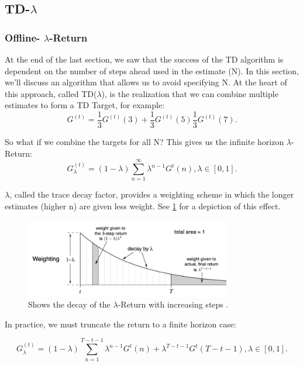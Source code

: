 \documentclass[11pt]{article}
\begin{document}
\subsection{TD-$\lambda$}
\subsubsection{Offline- $\lambda$-Return}
At the end of the last section, we saw that the success of the TD algorithm is dependent on the number of steps ahead used in the estimate (N). In this section, we'll discuss an algorithm that allows us to avoid specifying N. At the heart of this approach, called TD($\lambda$), is the realization that we can combine multiple estimates to form a TD Target, for example:
\begin{equation}
    G^{(t)} = \frac{1}{3}G^{(t)}(3)+\frac{1}{3}G^{(t)}(5)\frac{1}{3}G^{(t)}(7).
\end{equation}

So what if we combine the targets for all N? This gives us the infinite horizon $\lambda$-Return:
\begin{equation}
    G_\lambda^{(t)} = (1 - \lambda) \sum_{n=1}^\infty \lambda^{n-1} G^{t}(n), \lambda \in [0,1].
\end{equation}

$\lambda$, called the trace decay factor, provides a weighting scheme in which the longer estimates (higher n) are given less weight. See \ref{fig:decay} for a depiction of this effect.

\begin{figure}
    \centering
    \includegraphics[width=0.8\textwidth]{images/lambda decay.png}
    \caption{Shows the decay of the $\lambda$-Return with increasing steps \cite{sutton2018reinforcement}.}
    \label{fig:decay}
\end{figure}

In practice, we must truncate the return to a finite horizon case:

\begin{equation}
    G_\lambda^{(t)} = (1 - \lambda) \sum_{n=1}^{T - t - 1} \lambda^{n-1} G^{t}(n) + \lambda^{T - t - 1} G^{t}({T - t - 1}), \lambda \in [0,1].
\end{equation}
\end{document}
